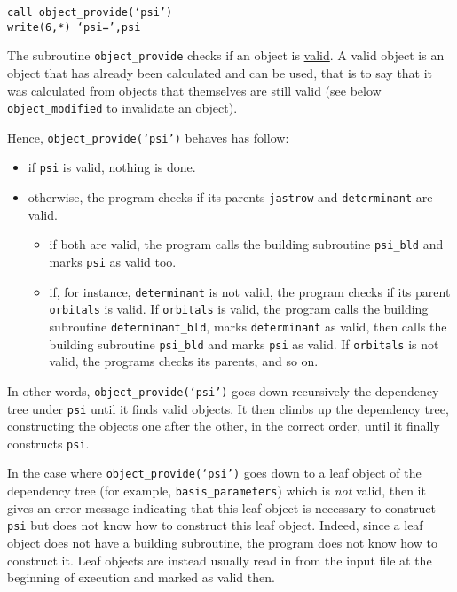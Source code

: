 \documentclass[letter,11pt]{article}
\newcommand\Def[1]{\underline{#1}}
\begin{document}
\vspace{0.5cm}
\noindent
{\tt call object_provide(`psi')\\
write(6,*) `psi=',psi}

\vspace{0.5cm}
The subroutine {\tt object_provide} checks if an object is \Def{valid}.
A valid object is an object that has already been calculated and can be used,
that is to say that it was calculated from objects that themselves are still valid
(see below {\tt object_modified} to invalidate an object).

Hence, {\tt object_provide(`psi')} behaves has follow:
\begin{itemize}
\item if {\tt psi} is valid, nothing is done. 
\item otherwise, the program checks if its parents {\tt jastrow} and {\tt determinant} are valid. 
\begin{itemize}
\item if both are valid, the program calls the building subroutine {\tt psi_bld} and marks {\tt psi} as valid too.
\item if, for instance, {\tt determinant} is not valid, the program checks if its parent {\tt orbitals} is valid.
      If {\tt orbitals} is valid, the program calls the building subroutine {\tt determinant_bld},
      marks {\tt determinant} as valid,
      then calls the building subroutine {\tt psi_bld} and marks {\tt psi} as valid.
      If {\tt orbitals} is not valid, the programs checks its parents, and so on.
\end{itemize}
\end{itemize}

In other words, {\tt object_provide(`psi')} goes down recursively the dependency tree under {\tt psi} until it finds valid objects. It then climbs up the dependency tree, constructing the objects one after the other, in the correct order, until it finally constructs {\tt psi}.

In the case where {\tt object_provide(`psi')} goes down to a leaf object of the dependency tree (for example, {\tt basis_parameters}) which is {\it not} valid, then it gives an error message indicating that this leaf object is necessary to construct {\tt psi} but does not know how to construct this leaf object. Indeed, since a leaf object does not have a building subroutine, the program does not know how to construct it. Leaf objects are instead usually read in from the input file at the beginning of execution and marked as valid then.
\end{document}
